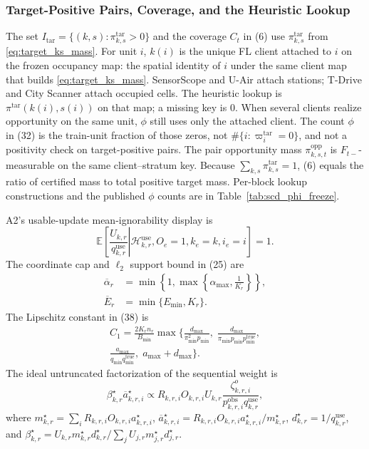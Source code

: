 \subsubsection{Target-Positive Pairs, Coverage, and the Heuristic Lookup}
\label{app:itar_lookup}
The set $I_{\mathrm{tar}}=\{(k,s):\pi^{\mathrm{tar}}_{k,s}>0\}$ and the
coverage $C_t$ in (6) use $\pi^{\mathrm{tar}}_{k,s}$ from
\eqref{eq:target_ks_mass}.  For unit $i$, $k(i)$ is the unique FL client
attached to $i$ on the frozen occupancy map: the spatial identity of $i$
under the same client map that builds \eqref{eq:target_ks_mass}.
SensorScope and U-Air attach stations; T-Drive and City Scanner attach
occupied cells.  The heuristic lookup is $\pi^{\mathrm{tar}}(k(i),s(i))$ on
that map; a missing key is $0$.  When several clients realize
opportunity on the same unit, $\phi$ still uses only the attached
client.  The count $\phi$ in (32) is the train-unit
fraction of those zeros, not $\#\{i:\varpi_i^{\mathrm{tar}}=0\}$, and
not a positivity check on target-positive pairs.
The pair opportunity mass $\pi^{\mathrm{opp}}_{k,s,t}$ is
$F_{t-}$-measurable on the same client--stratum key.
Because $\sum_{k,s}\pi^{\mathrm{tar}}_{k,s}=1$, (6) equals
the ratio of certified mass to total positive target mass.
Per-block lookup constructions and the published $\phi$ counts are in
Table~\ref{tab:scd_phi_freeze}.

A2's usable-update mean-ignorability display is
\begin{equation}
 \mathbb{E}\!\left[
 \left.
 \frac{U_{k,r}}{q^{\mathrm{use}}_{k,r}}
 \right|
 \mathcal{H}^{\mathrm{use}}_{k,r},
 O_e=1,k_e=k,i_e=i
 \right]
 =1.
 \label{eq:A2_use_mean_ignorability}
\end{equation}
The coordinate cap and $\ell_2$ support bound in (25) are
\begin{equation}
\begin{aligned}
 \overline\alpha_r
 &=
 \min\!\left\{
 1,
 \max\!\left\{
 \alpha_{\max},
 \frac{1}{K_r}
 \right\}
 \right\},\\
 \overline E_r
 &=
 \min\{E_{\min},K_r\}.
\end{aligned}
 \label{eq:cap_ess}
\end{equation}
The Lipschitz constant in (38) is
\begin{multline}
C_1
=
\frac{2K_r n_r}{B_{\min}}
\max\Biggl\{
\frac{d_{\max}}{\pi_{\min}^2 p_{\min}},\;
\frac{d_{\max}}{\pi_{\min}p_{\min}p_{\min}^{\mathrm{true}}},\\
\frac{a_{\max}}{q_{\min}q_{\min}^{\mathrm{true}}},\;
a_{\max}+d_{\max}
\Biggr\}.
\label{eq:g4_c1}
\end{multline}
The ideal untruncated factorization of the sequential weight is
\begin{equation}
 \beta^\star_{k,r}\overline a^\star_{k,r,i}
 \propto
 R_{k,r,i}O_{k,r,i}U_{k,r}
 \frac{\zeta^{o}_{k,r,i}}
 {p^{\mathrm{obs}}_{k,r,i}q^{\mathrm{use}}_{k,r}},
 \label{eq:factorized_global_weight}
\end{equation}
where
$m^\star_{k,r}=\sum_i R_{k,r,i}O_{k,r,i}a^\star_{k,r,i}$,
$\overline a^\star_{k,r,i}=R_{k,r,i}O_{k,r,i}a^\star_{k,r,i}/m^\star_{k,r}$,
$d^\star_{k,r}=1/q^{\mathrm{use}}_{k,r}$, and
$\beta^\star_{k,r}=U_{k,r}m^\star_{k,r}d^\star_{k,r}/
\sum_j U_{j,r}m^\star_{j,r}d^\star_{j,r}$.

